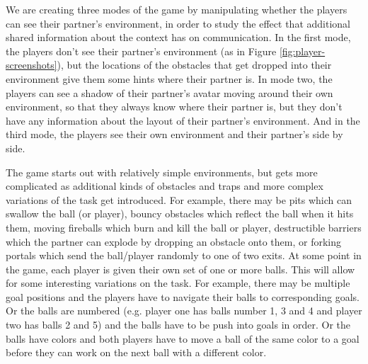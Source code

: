 
We are creating three modes of the game by manipulating whether the
players can see their partner's environment, in order to study the
effect that additional shared information about the context has on
communication.  In the first mode, the players don't see their
partner's environment (as in Figure \ref{fig:player-screenshots}), but
the locations of the obstacles that get dropped into their environment give
them some hints where their partner is. In mode two, the players can
see a shadow of their partner's avatar moving around their own
environment, so that they always know where their partner is, but they
don't have any information about the layout of their partner's
environment. And in the third mode, the players see their
own environment and their partner's side by side.



The game starts out with relatively simple environments, but gets more
complicated as additional kinds of obstacles and traps and more
complex variations of the task get introduced.  For example, there may
be pits which can swallow the ball (or player), bouncy obstacles which
reflect the ball when it hits them, moving fireballs which burn and
kill the ball or player, destructible barriers which the partner can
explode by dropping an obstacle onto them, or forking portals which
send the ball/player randomly to one of two exits.  At some point in
the game, each player is given their own set of one or more balls. This
will allow for some interesting variations on the task. For example,
there may be multiple goal positions and the players have to navigate
their balls to corresponding goals. Or the balls are numbered
(e.g. player one has balls number 1, 3 and 4 and player two has balls
2 and 5) and the balls have to be push into goals in order. Or the
balls have colors and both players have to move a ball of the same
color to a goal before they can work on the next ball with a different
color.
